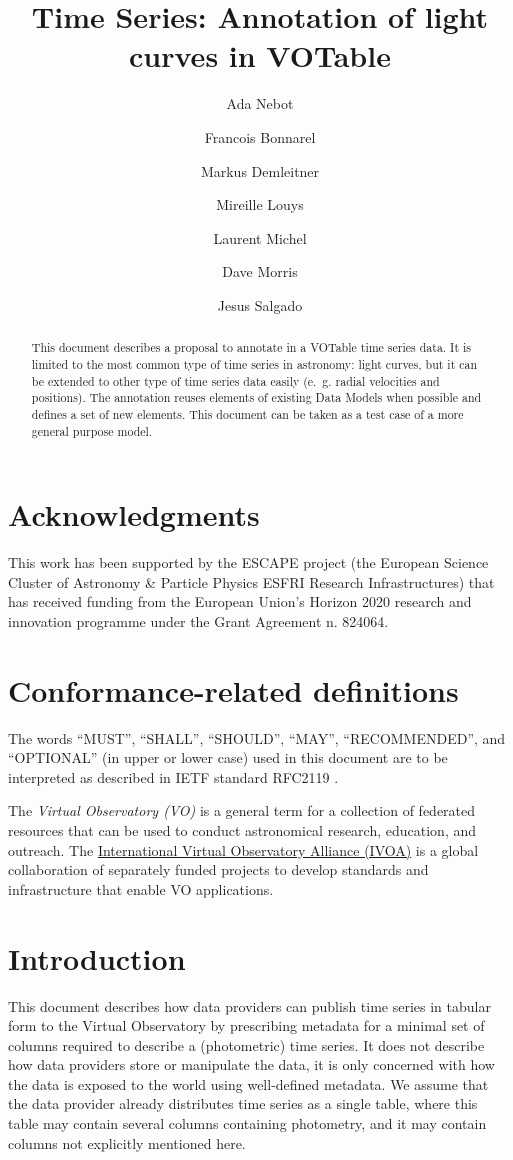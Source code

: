 \documentclass[11pt,a4paper]{ivoa}
\title{Time Series: Annotation of light curves in VOTable}
\author[http://www.ivoa.net/twiki/bin/view/IVOA/AdaNebot]{Ada Nebot}
\author[http://www.ivoa.net/twiki/bin/view/IVOA/FrancoisBonnarel]{Francois Bonnarel}
\author[http://www.ivoa.net/twiki/bin/view/IVOA/MarkusDemleitner]{Markus Demleitner}
\author[http://www.ivoa.net/twiki/bin/view/IVOA/MireilleLouys]{Mireille Louys}
\author[http://www.ivoa.net/twiki/bin/view/IVOA/LaurentMichel]{Laurent Michel}
\author[http://www.ivoa.net/twiki/bin/view/IVOA/DaveMorris]{Dave Morris}
\author[http://www.ivoa.net/twiki/bin/view/IVOA/JesusSalgado]{Jesus Salgado}
\begin{document}
\begin{abstract}
  This document describes a proposal to annotate in a VOTable time series data. It is limited to the most common type of time series in astronomy: light curves, but it can be extended to other type of time series data easily (e.~g. radial velocities and positions). The annotation reuses elements of existing Data Models when possible and defines a set of new elements. This document can be taken as a test case of a more general purpose model. 
\end{abstract}

\section*{Acknowledgments}
This work has been supported by the ESCAPE project (the European Science Cluster of Astronomy \& Particle Physics ESFRI Research Infrastructures) that has received funding from the European Union’s Horizon 2020 research and innovation programme under the Grant Agreement n. 824064.

\section*{Conformance-related definitions}

The words ``MUST'', ``SHALL'', ``SHOULD'', ``MAY'', ``RECOMMENDED'', and
``OPTIONAL'' (in upper or lower case) used in this document are to be
interpreted as described in IETF standard RFC2119 \citet{std:RFC2119}.

The \emph{Virtual Observatory (VO)} is a
general term for a collection of federated resources that can be used
to conduct astronomical research, education, and outreach.
The \href{http://www.ivoa.net}{International
Virtual Observatory Alliance (IVOA)} is a global
collaboration of separately funded projects to develop standards and
infrastructure that enable VO applications.


\section{Introduction}
This document describes how data providers can publish time series in tabular form to the Virtual Observatory by prescribing metadata for a minimal set of columns required to describe a (photometric) time series.  It does not describe how data providers store or manipulate the data, it is only concerned with how the data is exposed to the world using well-defined metadata. We assume that the data provider already distributes time series as a single table, where this table may contain several columns containing photometry, and it may contain columns not explicitly mentioned here. 
\end{document}
